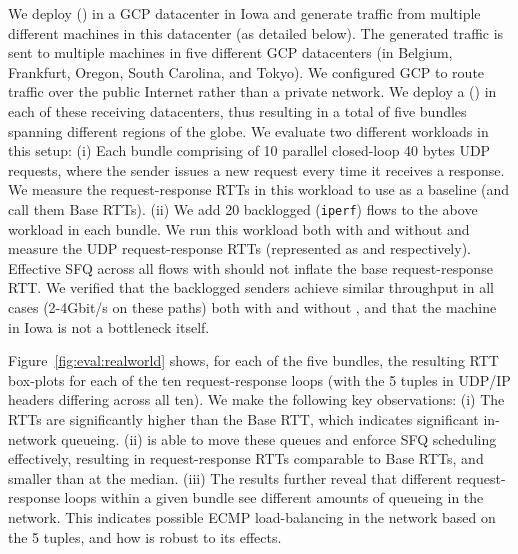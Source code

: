 We deploy \name (\inbox) in a GCP datacenter in Iowa and generate traffic from multiple different machines in this datacenter (as detailed below). 
The generated traffic is sent to multiple machines in five different GCP datacenters (in Belgium, Frankfurt, Oregon, South Carolina, and Tokyo). We configured GCP to route traffic over the public Internet rather than a private network. 
We deploy a \name (\outbox) in each of these receiving datacenters, thus resulting in a total of five bundles spanning different regions of the globe.
We evaluate two different workloads in this setup: (i) Each bundle comprising of 10 parallel closed-loop 40 bytes UDP requests, where the sender issues a new request every time it receives a response. We measure the request-response RTTs in this workload to use as a baseline (and call them Base RTTs). (ii) We add 20 backlogged (\texttt{iperf}) flows to the above workload in each bundle. We run this workload both with and without \name and measure the UDP request-response RTTs (represented as \name and \baseline respectively). Effective SFQ across all flows with \name should not inflate the base request-response RTT.
We verified that the backlogged senders achieve similar throughput in all cases (2-4Gbit/s on these paths) both with and without \name, and that the \name machine in Iowa is not a bottleneck itself. 

Figure~\ref{fig:eval:realworld} shows, for each of the five bundles, the resulting RTT box-plots for each of the ten request-response loops (with the 5 tuples in UDP/IP headers differing across all ten). 
We make the following key observations: (i) The \baseline RTTs are significantly higher than the Base RTT, which indicates significant in-network queueing. (ii) \name is able to move these queues and enforce SFQ scheduling effectively, resulting in request-response RTTs comparable to Base RTTs, and \realworldMedianLatencyImprovement smaller than \baseline at the median.
(iii) The \baseline results further reveal that different request-response loops within a given bundle see different amounts of queueing in the network. This indicates possible ECMP load-balancing in the network based on the 5 tuples, and how \name is robust to its effects.

